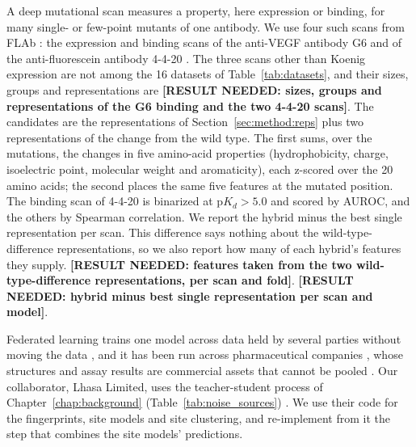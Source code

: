 A deep mutational scan measures a property, here expression or binding, for many single- or few-point mutants of one antibody. We use four such scans from FLAb \citep{Chungyoun2024}: the expression and binding scans of the anti-VEGF antibody G6 \citep{Koenig2017} and of the anti-fluorescein antibody 4-4-20 \citep{Adams2016}. The three scans other than Koenig expression are not among the 16 datasets of Table~\ref{tab:datasets}, and their sizes, groups and representations are \textbf{[RESULT NEEDED: sizes, groups and representations of the G6 binding and the two 4-4-20 scans]}. The candidates are the representations of Section~\ref{sec:method:reps} plus two representations of the change from the wild type. The first sums, over the mutations, the changes in five amino-acid properties (hydrophobicity, charge, isoelectric point, molecular weight and aromaticity), each z-scored over the 20 amino acids; the second places the same five features at the mutated position. The binding scan of 4-4-20 is binarized at $\mathrm{p}K_d > 5.0$ and scored by AUROC, and the others by Spearman correlation. We report the hybrid minus the best single representation per scan. %
This difference says nothing about the wild-type-difference representations, so we also report how many of each hybrid's features they supply. \textbf{[RESULT NEEDED: features taken from the two wild-type-difference representations, per scan and fold]}. \textbf{[RESULT NEEDED: hybrid minus best single representation per scan and model]}.

Federated learning trains one model across data held by several parties without moving the data \citep{McMahan2017}, and it has been run across pharmaceutical companies \citep{Heyndrickx2024}, whose structures and assay results are commercial assets that cannot be pooled \citep{Hanser2023,Bassani2023}. Our collaborator, Lhasa Limited, uses the teacher-student process of Chapter~\ref{chap:background} (Table~\ref{tab:noise_sources}) \citep{Hanser2025}. We use their code for the fingerprints, site models and site clustering, and re-implement from it the step that combines the site models' predictions.

